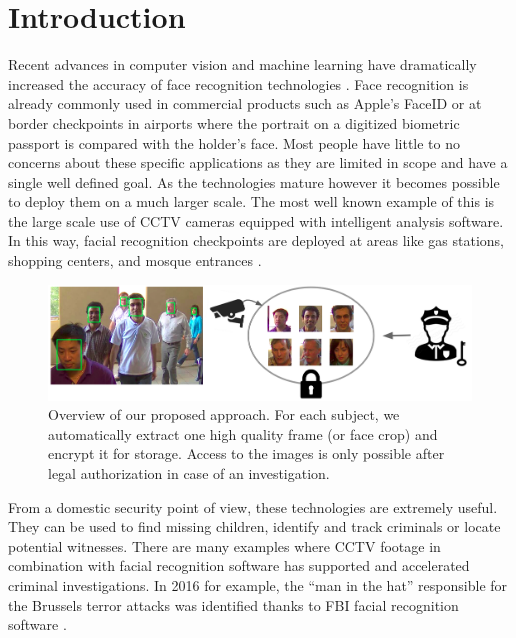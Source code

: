 \documentclass[letterpaper]{article} %
\begin{document}
\section{Introduction}
Recent advances in computer vision and machine learning have dramatically increased the accuracy of face recognition technologies \cite{schroff2015facenet, masi2018deep, deng2019arcface}. Face recognition is already commonly used in commercial products such as Apple's FaceID \cite{faceid} or at border checkpoints in airports where the portrait on a digitized biometric passport is compared with the holder's face. Most people have little to no concerns about these specific applications as they are limited in scope and have a single well defined goal. As the technologies mature however it becomes possible to deploy them on a much larger scale. The most well known example of this is the large scale use of CCTV cameras equipped with intelligent analysis software. In this way, facial recognition checkpoints are deployed at areas like gas stations, shopping centers, and mosque entrances \cite{larson2018china, NOS}.
\begin{figure}
    \centering
    \includegraphics[width=\linewidth]{figures/overview_.png}
    \setlength{\abovecaptionskip}{-2pt}
    \setlength{\belowcaptionskip}{-2pt}
    \caption{Overview of our proposed approach. For each subject, we automatically extract one high quality frame (or face crop) and encrypt it for storage. Access to the images is only possible after legal authorization in case of an investigation.}
    \label{fig:overview}
\end{figure}
From a domestic security point of view, these technologies are extremely useful. They can be used to find missing children, identify and track criminals or locate potential witnesses. There are many examples where CCTV footage in combination with facial recognition software has supported and accelerated criminal investigations. In 2016 for example, the ``man in the hat'' responsible for the Brussels terror attacks was identified thanks to FBI facial recognition software \cite{maninhat}.
\\
\newline
\end{document}
